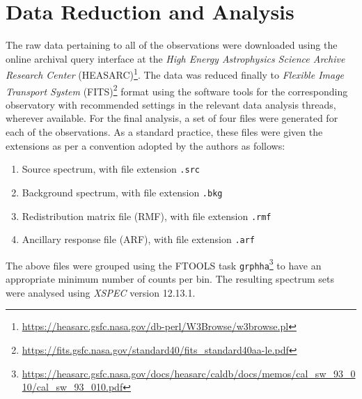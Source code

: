\section{Data Reduction and Analysis} \label{sec:reduction-analysis}
    The raw data pertaining to all of the observations were downloaded using the online archival query interface at the \textit{High Energy Astrophysics Science Archive Research Center} (HEASARC)\footnote{\url{https://heasarc.gsfc.nasa.gov/db-perl/W3Browse/w3browse.pl}}. The data was reduced finally to \textit{Flexible Image Transport System} (FITS)\footnote{\url{https://fits.gsfc.nasa.gov/standard40/fits_standard40aa-le.pdf}} format using the software tools for the corresponding observatory with recommended settings in the relevant data analysis threads, wherever available. For the final analysis, a set of four files were generated for each of the observations. As a standard practice, these files were given the extensions as per a convention adopted by the authors as follows:
    \begin{enumerate}
    	\item Source spectrum, with file extension \texttt{.src}
    	\item Background spectrum, with file extension \texttt{.bkg}
    	\item Redistribution matrix file (RMF), with file extension \texttt{.rmf}
    	\item Ancillary response file (ARF), with file extension \texttt{.arf}
    \end{enumerate}
    The above files were grouped using the FTOOLS task \texttt{grphha}\footnote{\url{https://heasarc.gsfc.nasa.gov/docs/heasarc/caldb/docs/memos/cal_sw_93_010/cal_sw_93_010.pdf}} to have an appropriate minimum number of counts per bin. The resulting spectrum sets were analysed using \textit{XSPEC} version 12.13.1.
    
